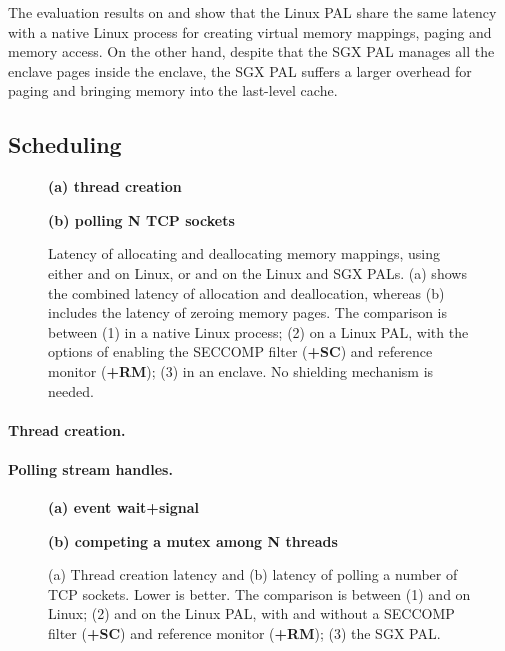 The evaluation results on  and 
show that the Linux PAL share the same latency
with a native Linux process
for creating virtual memory mappings, paging and memory access.
On the other hand, despite that the SGX PAL manages all the enclave pages
inside the enclave,
the SGX PAL suffers a larger overhead for paging and bringing memory into the last-level cache.



\subsection{Scheduling}




\begin{figure*}[t!]
\centering
\footnotesize
{}
\parbox{0.49\textwidth}{\centering\bf (a) thread creation}
\parbox{0.49\textwidth}{\centering\bf (b) polling N TCP sockets}
\caption{Latency of allocating and deallocating memory mappings, using either  and  on Linux, or  and  on the Linux and SGX PALs.
(a) shows the combined latency of allocation and deallocation, whereas (b) includes the latency of zeroing memory pages.
The comparison is between (1) \linuxapis{} in a native Linux process; (2) \hostapis{} on a Linux PAL, with the options of enabling the SECCOMP filter ({\bf +SC}) and reference monitor ({\bf +RM}); (3) \hostapis{} in an enclave. No shielding mechanism is needed.}
\label{fig:eval:pal:thread-select-latency}
\end{figure*}


\paragraph{Thread creation.}



\paragraph{Polling stream handles.}




\begin{figure*}[t!]
\centering
\footnotesize
{}
\parbox{0.49\textwidth}{\centering\bf (a) event wait+signal}
\parbox{0.49\textwidth}{\centering\bf (b) competing a mutex among N threads}
\caption{(a) Thread creation latency and (b) latency of polling a number of TCP sockets.
Lower is better.
The comparison is between (1)  and  on Linux; (2)  and  on the Linux PAL, with and without a SECCOMP filter ({\bf +SC}) and reference monitor ({\bf +RM}); (3) the SGX PAL.}
\label{fig:eval:pal:sched-latency}
\end{figure*}



